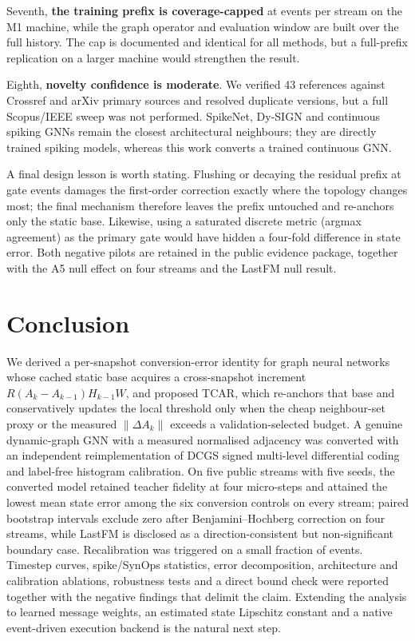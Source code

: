 \documentclass[preprint,12pt]{elsarticle}
\begin{document}
Seventh, \textbf{the training prefix is coverage-capped} at \TrainCoverage{} events per stream on the M1 machine, while the graph operator and evaluation window are built over the full history. The cap is documented and identical for all methods, but a full-prefix replication on a larger machine would strengthen the result.

Eighth, \textbf{novelty confidence is moderate}. We verified 43 references against Crossref and arXiv primary sources and resolved duplicate versions, but a full Scopus/IEEE sweep was not performed. SpikeNet, Dy-SIGN and continuous spiking GNNs \cite{li2023spikenet,yin2024dysign,li2024continuousgnn} remain the closest architectural neighbours; they are directly trained spiking models, whereas this work converts a trained continuous GNN.

A final design lesson is worth stating. Flushing or decaying the residual prefix at gate events damages the first-order correction exactly where the topology changes most; the final mechanism therefore leaves the prefix untouched and re-anchors only the static base. Likewise, using a saturated discrete metric (argmax agreement) as the primary gate would have hidden a four-fold difference in state error. Both negative pilots are retained in the public evidence package, together with the A5 null effect on four streams and the LastFM null result.

\section{Conclusion}
\label{sec:conclusion}

We derived a per-snapshot conversion-error identity for graph neural networks whose cached static base acquires a cross-snapshot increment $R(A_k-A_{k-1})H_{k-1}W$, and proposed TCAR, which re-anchors that base and conservatively updates the local threshold only when the cheap neighbour-set proxy or the measured $\|\Delta A_k\|$ exceeds a validation-selected budget. A genuine dynamic-graph GNN with a measured normalised adjacency was converted with an independent reimplementation of DCGS signed multi-level differential coding and label-free histogram calibration. On five public streams with five seeds, the converted model retained teacher fidelity at four micro-steps and attained the lowest mean state error among the six conversion controls on every stream; paired bootstrap intervals exclude zero after Benjamini--Hochberg correction on four streams, while LastFM is disclosed as a direction-consistent but non-significant boundary case. Recalibration was triggered on a small fraction of events. Timestep curves, spike/SynOps statistics, error decomposition, architecture and calibration ablations, robustness tests and a direct bound check were reported together with the negative findings that delimit the claim. Extending the analysis to learned message weights, an estimated state Lipschitz constant and a native event-driven execution backend is the natural next step.
\end{document}
